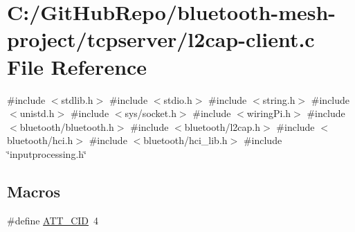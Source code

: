 \hypertarget{tcpserver_2l2cap-client_8c}{}\section{C\+:/\+Git\+Hub\+Repo/bluetooth-\/mesh-\/project/tcpserver/l2cap-\/client.c File Reference}
\label{tcpserver_2l2cap-client_8c}
{\ttfamily \#include $<$stdlib.\+h$>$}\newline
{\ttfamily \#include $<$stdio.\+h$>$}\newline
{\ttfamily \#include $<$string.\+h$>$}\newline
{\ttfamily \#include $<$unistd.\+h$>$}\newline
{\ttfamily \#include $<$sys/socket.\+h$>$}\newline
{\ttfamily \#include $<$wiring\+Pi.\+h$>$}\newline
{\ttfamily \#include $<$bluetooth/bluetooth.\+h$>$}\newline
{\ttfamily \#include $<$bluetooth/l2cap.\+h$>$}\newline
{\ttfamily \#include $<$bluetooth/hci.\+h$>$}\newline
{\ttfamily \#include $<$bluetooth/hci\+\_\+lib.\+h$>$}\newline
{\ttfamily \#include \char`\"{}inputprocessing.\+h\char`\"{}}\newline
\subsection*{Macros}
\begin{DoxyCompactItemize}
\item 
\#define \mbox{\hyperlink{tcpserver_2l2cap-client_8c_acd26973fe5a2cba0e34e0d81717c6bda}{A\+T\+T\+\_\+\+C\+ID}}~4
\end{DoxyCompactItemize}
